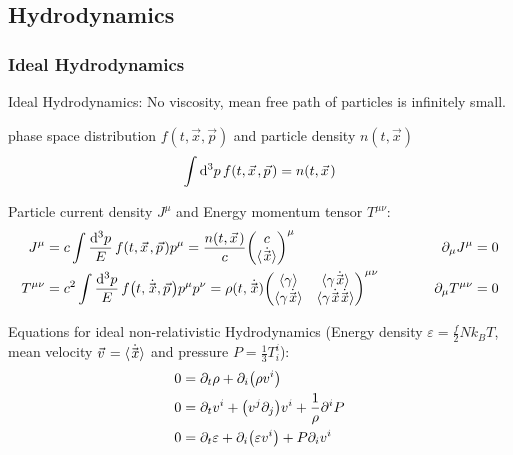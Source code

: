 	\subsection{Hydrodynamics}
		\subsubsection{Ideal Hydrodynamics}	
			Ideal Hydrodynamics: No viscosity, mean free path of particles is infinitely small.

			\noindent
			phase space distribution $f(t, \vec{x},\vec{p})$ and particle density $n(t,\vec{x})$
			\begin{equation}
				\int \dd^3 p\, f\qty(t, \vec{x}, \vec{p}) = n\qty(t,\vec{x})
			\end{equation}

			\noindent
			Particle current density $J^\mu$ and Energy momentum tensor $T^{\mu\nu}$:
			\begin{equation}
				\begin{aligned}
					J^{\mu} &= c \int \frac{\dd^3 p}{E}\, f\qty(t, \vec{x}, \vec{p}) p^{\mu} = \frac{n(t, \vec{x})}{c} \mqty(c\\\avg{\dot{\vec{x}}})^\mu 
					&\hsp
					\partial_\mu J^{\mu} &= 0 \\
					T^{\mu\nu} &= c^2 \int \frac{\dd^3 p}{E}\, f\qty(t, \dot{\vec{x}}, \vec{p}) p^{\mu} p^{\nu} =\rho(t, \dot{\vec{x}})\mqty(\avg{\gamma} & \avg{\gamma \dot{\vec{x}}} \\ \avg{\gamma \dot{\vec{x}}} & \avg{\gamma\dot{\vec{x}}\dot{\vec{x}}})^{\mu\nu}
					&\hsp
					\partial_\mu T^{\mu\nu} &= 0 \\
				\end{aligned}
			\end{equation}

			\noindent
			Equations for ideal non-relativistic Hydrodynamics (Energy density $\varepsilon=\frac{f}{2}N k_B T$, mean velocity $\vec{v}=\avg{\dot{\vec{x}}}$ and pressure $P = \frac{1}{3} T^{i}_i$):
			\begin{equation}
				\begin{aligned}
					0 &= \partial_t \rho + \partial_i \qty(\rho v^i) \\
					0 &= \partial_t v^i + \qty(v^j \partial_j) v^i + \frac{1}{\rho} \partial^i P \\
					0 &= \partial_t \varepsilon + \partial_i \qty(\varepsilon v^i) + P \partial_i v^i  \\
				\end{aligned}
			\end{equation}

